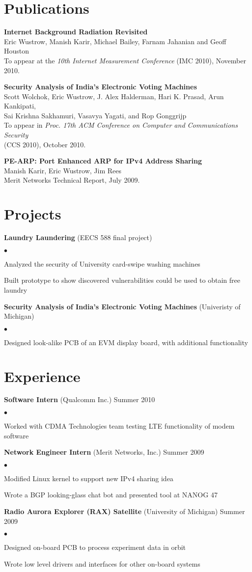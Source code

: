 \documentclass{res}
\newcommand{\sqitem}{\item[\tiny$\blacksquare$]}
\newcommand{\sqlist}{\begin{list}{$\bullet$}
  { \setlength{\itemsep}{0pt}
	\setlength{\parsep}{0pt}
	\setlength{\topsep}{0pt}
	\setlength{\partopsep}{0pt}
	\setlength{\leftmargin}{6.0em}
	\setlength{\labelsep}{2.5em} } }
\newcommand{\sqend}{\end{list}}
\begin{document}
\begin{resume}
\section{Publications}
	\textbf{Internet Background Radiation Revisited} \\
	Eric Wustrow, Manish Karir, Michael Bailey, Farnam Jahanian and Geoff Houston \\
	To appear at the \emph{10th Internet Measurement Conference} 
	(IMC 2010), November 2010.
	
	\textbf{Security Analysis of India's Electronic Voting  Machines} \\ 
	Scott Wolchok, Eric Wustrow, J. Alex Halderman, Hari K. Prasad, Arun Kankipati, \\
	Sai Krishna Sakhamuri, Vasavya Yagati, and Rop Gonggrijp \\
	To appear in \emph{Proc. 17th ACM Conference on Computer and Communications 
	Security} \\
	(CCS 2010), October 2010.

	\textbf{PE-ARP: Port Enhanced ARP for IPv4 Address Sharing} \\
	Manish Karir, Eric Wustrow, Jim Rees \\
	Merit Networks Technical Report, July 2009.	


\section{Projects}
	\textbf{Laundry Laundering} (EECS 588 final project)
		\sqlist
		\sqitem Analyzed the security of University card-swipe washing machines
		\sqitem Built prototype to show discovered vulnerabilities could be used 
				to obtain free laundry
		\sqend 
	
	\textbf{Security Analysis of India's Electronic Voting Machines}
		(Univeristy of Michigan)
		\sqlist
		\sqitem Designed look-alike PCB of an EVM display board, with additional
				functionality
		\sqend 


\section{Experience}

	\textbf{Software Intern} (Qualcomm Inc.) Summer 2010
		\sqlist
		\sqitem Worked with CDMA Technologies team testing LTE functionality of 
			modem software
		\sqend

	\textbf{Network Engineer Intern} (Merit Networks, Inc.) Summer 2009
		\sqlist
		\sqitem Modified Linux kernel to support new IPv4 sharing idea
		\sqitem Wrote a BGP looking-glass chat bot and presented tool at NANOG 47
		\sqend

	\textbf{Radio Aurora Explorer (RAX) Satellite} (University of Michigan) Summer 2009
		\sqlist
		\sqitem Designed on-board PCB to process experiment data in orbit
		\sqitem Wrote low level drivers and interfaces for other on-board systems
		\sqend

\end{resume}
\end{document}
